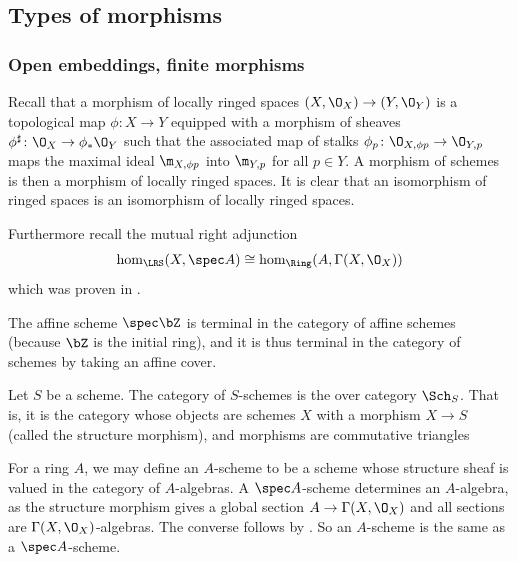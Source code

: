 \subsection{Types of morphisms}

\subsubsection{Open embeddings, finite morphisms}

Recall that a morphism of locally ringed spaces $(X,\O_X)\to(Y,\O_Y)$ is a topological map $\phi\colon X\to Y$
equipped with a morphism of sheaves $\phi^\sharp\colon\O_X\to\phi_*\O_Y$ such that the associated map
of stalks $\phi_p\colon\O_{X,\phi p}\to\O_{Y,p}$ maps the maximal ideal $\m_{X,\phi p}$ into $\m_{Y,p}$
for all $p\in Y$.
A morphism of schemes is then a morphism of locally ringed spaces.
It is clear that an isomorphism of ringed spaces is an isomorphism of locally ringed spaces.

Furthermore recall the mutual right adjunction
$$ \hom_{\LRS}(X,\spec A) \cong \hom_\Ring(A,\Gamma(X,\O_X)) $$
which was proven in .

The affine scheme $\spec\bZ$ is terminal in the category of affine schemes (because $\bZ$ is the initial ring),
and it is thus terminal in the category of schemes by taking an affine cover.

\bdefn

    Let $S$ be a scheme.
    The category of {\emphcolor $S$-schemes} is the over category $\Sch_S$.
    That is, it is the category whose objects are schemes $X$ with a morphism $X\to S$ (called the
    {\emphcolor structure morphism}), and morphisms
    are commutative triangles


\edefn

For a ring $A$, we may define an $A$-scheme to be a scheme whose structure sheaf is valued in the category
of $A$-algebras.
A $\spec A$-scheme determines an $A$-algebra, as the structure morphism gives a global section
$A\to\Gamma(X,\O_X)$ and all sections are $\Gamma(X,\O_X)$-algebras.
The converse follows by .
So an $A$-scheme is the same as a $\spec A$-scheme.

\bdefn

